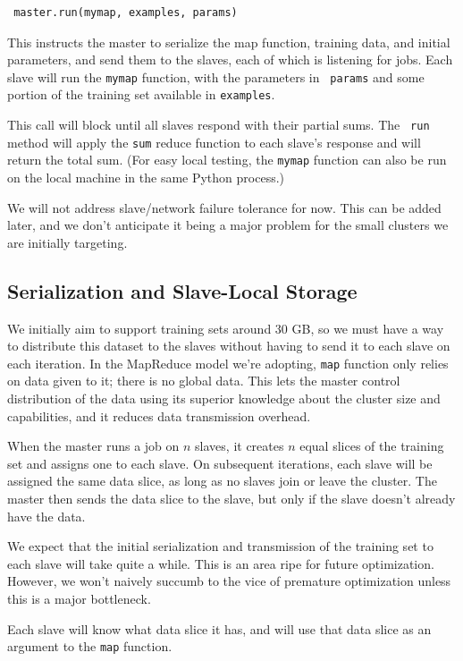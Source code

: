 \documentclass[%
  final,
  notitlepage,
  narroweqnarray,
  inline,
]{ieee}
\begin{document}
\begin{verbatim}
 master.run(mymap, examples, params)
\end{verbatim}

This instructs the master to serialize the map function, training data, and
initial parameters, and send them to the slaves, each of which is listening for
jobs. Each slave will run the {\tt mymap} function, with the parameters in {\tt
  params} and some portion of the training set available in {\tt examples}.

This call will block until all slaves respond with their partial sums. The {\tt
  run} method will apply the {\tt sum} reduce function to each slave's response
and will return the total sum. (For easy local testing, the {\tt mymap}
function can also be run on the local machine in the same Python process.)

We will not address slave/network failure tolerance for now. This can be added
later, and we don't anticipate it being a major problem for the small clusters
we are initially targeting.

\subsection{Serialization and Slave-Local Storage}

We initially aim to support training sets around 30 GB, so we must have a way
to distribute this dataset to the slaves without having to send it to each
slave on each iteration. In the MapReduce model we're adopting, {\tt map}
function only relies on data given to it; there is no global data. This lets
the master control distribution of the data using its superior knowledge about
the cluster size and capabilities, and it reduces data transmission overhead.

When the master runs a job on $n$ slaves, it creates $n$ equal slices of the
training set and assigns one to each slave. On subsequent iterations, each
slave will be assigned the same data slice, as long as no slaves join or leave
the cluster. The master then sends the data slice to the slave, but only if the
slave doesn't already have the data.

We expect that the initial serialization and transmission of the training set
to each slave will take quite a while. This is an area ripe for future
optimization. However, we won't naively succumb to the vice of premature
optimization unless this is a major bottleneck.

Each slave will know what data slice it has, and will use that data slice as an
argument to the {\tt map} function.
\end{document}
